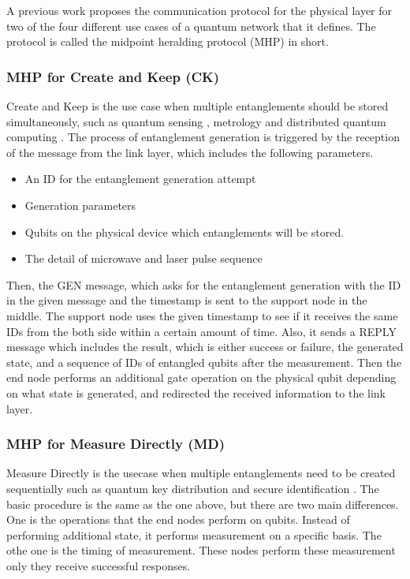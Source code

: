A previous work \cite{Dahlberg_2019} proposes the communication protocol for the physical layer for two of the four different use cases of a quantum network that it defines.
The protocol is called the midpoint heralding protocol (MHP) in short.

\subsubsection{MHP for Create and Keep (CK)}

Create and Keep is the use case when multiple entanglements should be stored simultaneously, such as quantum sensing \cite{PhysRevLett.109.070503}, metrology \cite{komar2014quantum} and distributed quantum computing \cite{10.1145/1060590.1060662}.
The process of entanglement generation is triggered by the reception of the message from the link layer, which includes the following parameters.
\begin{itemize}
  \item An ID for the entanglement generation attempt
  \item Generation parameters
  \item Qubits on the physical device which entanglements will be stored.
  \item The detail of microwave and laser pulse sequence
\end{itemize}

Then, the GEN message, which asks for the entanglement generation with the ID in the given message and the timestamp is sent to the support node in the middle. 
The support node uses the given timestamp to see if it receives the same IDs from the both side within a certain amount of time.
Also, it sends a REPLY message which includes the result, which is either success or failure, the generated state, and a sequence of IDs of entangled qubits after the measurement.
Then the end node performs an additional gate operation on the physical qubit depending on what state is generated, and redirected the received information to the link layer.

\subsubsection{MHP for Measure Directly (MD)}

Measure Directly is the usecase when multiple entanglements need to be created sequentially such as quantum key distribution \cite{PhysRevLett.67.661} and secure identification \cite{damgaard2007secure}.
The basic procedure is the same as the one above, but there are two main differences.  One is the operations that the end nodes perform on qubits.
Instead of performing additional state, it performs measurement on a specific basis.  The othe one is the timing of measurement. These nodes perform these measurement only they receive successful responses.


